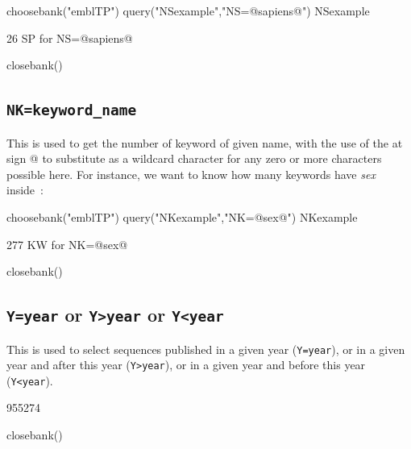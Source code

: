 \documentclass{article}
\begin{document}
\begin{Schunk}
\begin{Sinput}
 choosebank("emblTP")
 query("NSexample","NS=@sapiens@")
 NSexample
\end{Sinput}
\begin{Soutput}
26 SP for NS=@sapiens@
\end{Soutput}
\begin{Sinput}
 closebank()
\end{Sinput}
\end{Schunk}

\subsection{\texttt{NK=keyword\_name}}

This is used to get the number of keyword of given name, with the use of the at sign @ to 
substitute as a wildcard character for any zero or more characters 
possible here. For instance, we want to know how many keywords have \textit{sex} inside~:

\begin{Schunk}
\begin{Sinput}
 choosebank("emblTP")
 query("NKexample","NK=@sex@")
 NKexample
\end{Sinput}
\begin{Soutput}
277 KW for NK=@sex@
\end{Soutput}
\begin{Sinput}
 closebank()
\end{Sinput}
\end{Schunk}

\subsection{\texttt{Y=year} or \texttt{Y>year} or \texttt{Y<year}}

This is used to select sequences published in a given year (\texttt{Y=year}),
or in a given year and after this year (\texttt{Y>year}), or in a given
year and before this year (\texttt{Y<year}).

\begin{Schunk}
\begin{Soutput}
[1] 955274
\end{Soutput}
\begin{Sinput}
 closebank()
\end{Sinput}
\end{Schunk}
\end{document}
